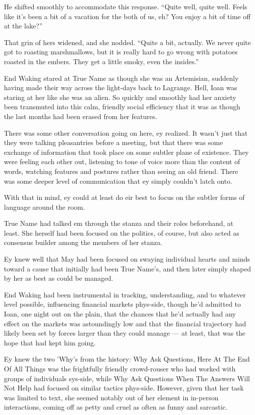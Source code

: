 He shifted smoothly to accommodate this response. ``Quite well, quite well. Feels like it's been a bit of a vacation for the both of us, eh? You enjoy a bit of time off at the lake?''

That grin of hers widened, and she nodded. ``Quite a bit, actually. We never quite got to roasting marshmallows, but it is really hard to go wrong with potatoes roasted in the embers. They get a little smoky, even the insides.''

End Waking stared at True Name as though she was an Artemisian, suddenly having made their way across the light-days back to Lagrange. Hell, Ioan was staring at her like she was an alien. So quickly and smoothly had her anxiety been transmuted into this calm, friendly social efficiency that it was as though the last months had been erased from her features.

There was some other conversation going on here, ey realized. It wasn't just that they were talking pleasantries before a meeting, but that there was some exchange of information that took place on some subtler plane of existence. They were feeling each other out, listening to tone of voice more than the content of words, watching features and postures rather than seeing an old friend. There was some deeper level of communication that ey simply couldn't latch onto.

With that in mind, ey could at least do eir best to focus on the subtler forms of language around the room.

True Name had talked em through the stanza and their roles beforehand, at least. She herself had been focused on the politics, of course, but also acted as consensus builder among the members of her stanza.

Ey knew well that May had been focused on swaying individual hearts and minds toward a cause that initially had been True Name's, and then later simply shaped by her as best as could be managed.

End Waking had been instrumental in tracking, understanding, and to whatever level possible, influencing financial markets phys-side, though he'd admitted to Ioan, one night out on the plain, that the chances that he'd actually had any effect on the markets was astoundingly low and that the financial trajectory had likely been set by forces larger than they could manage — at least, that was the hope that had kept him going.

Ey knew the two 'Why's from the history: Why Ask Questions, Here At The End Of All Things was the frightfully friendly crowd-rouser who had worked with groups of individuals sys-side, while Why Ask Questions When The Answers Will Not Help had focused on similar tactics phys-side. However, given that her task was limited to text, she seemed notably out of her element in in-person interactions, coming off as petty and cruel as often as funny and sarcastic.

